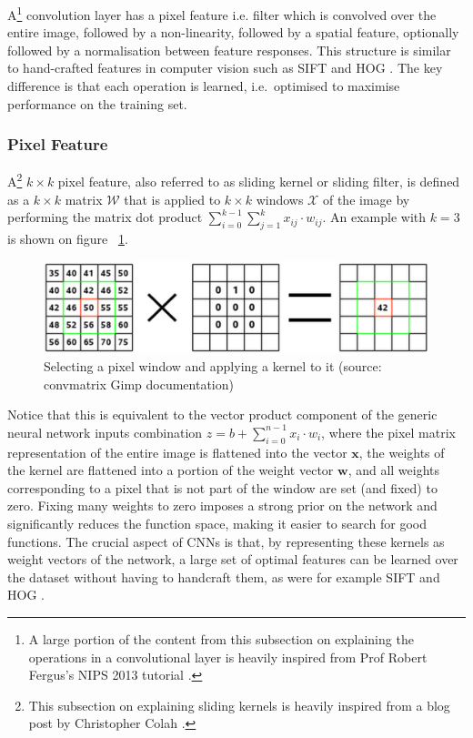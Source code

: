 \documentclass[a4paper,11pt]{article}
\begin{document}
A\footnote{A large portion of the content from this subsection on explaining the operations in a convolutional layer is heavily inspired from Prof Robert Fergus's NIPS 2013 tutorial \cite{fergus_tutorial}.} convolution layer has a pixel feature i.e. filter which is convolved over the entire image, followed by a non-linearity, followed by a spatial feature, optionally followed by a normalisation between feature responses. This structure is similar to hand-crafted features in computer vision such as SIFT and HOG \cite{SIFT}. The key difference is that each operation is learned, i.e.\ optimised to maximise performance on the training set. \\

\subsubsection{Pixel Feature}

A\footnote{This subsection on explaining sliding kernels is heavily inspired from a blog post by Christopher Colah \cite{colah}.} $k \times k$ pixel feature, also referred to as sliding kernel or sliding filter, is defined as a $k \times k$ matrix $\mathcal{W}$ that is applied to $k \times k$ windows $\mathcal{X}$ of the image by performing  the matrix dot product $\sum_{i=0}^{k-1} \sum_{j=1}^{k} x_{ij} \cdot w_{ij}$. An example with $k=3$ is shown on figure ~\ref{f19}.

\begin{figure}[h!]
	\centering
	\includegraphics[scale=0.3]{images/window_x_kernel.png}
	\caption{Selecting a pixel window and applying a kernel to it (source: convmatrix Gimp documentation)}
    \label{f19}
\end{figure}

Notice that this is equivalent to the vector product component of the generic neural network inputs combination $z = b + \sum\limits_{i=0}^{n-1} x_{i}\cdot w_{i}$, where the pixel matrix representation of the entire image is flattened into the vector $\textbf{x}$, the weights of the kernel are flattened into a portion of the weight vector $\textbf{w}$, and all weights corresponding to a pixel that is not part of the window are set (and fixed) to zero. Fixing many weights to zero imposes a strong prior on the network and significantly reduces the function space, making it easier to search for good functions. The crucial aspect of CNNs is that, by representing these kernels as weight vectors of the network, a large set of optimal features can be learned over the dataset without having to handcraft them, as were for example SIFT and HOG \cite{SIFT}. \\
\end{document}
